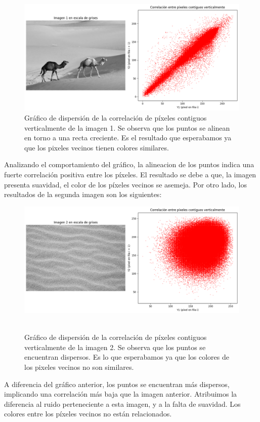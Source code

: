 \documentclass[a4paper,12pt]{article}
\begin{document}
\begin{figure}[H]
    \centering
    \includegraphics[width=1\textwidth]{Ejercicio1a.png}
        \caption{Gráfico de dispersión de la correlación de píxeles contiguos verticalmente de la imagen 1. 
    Se observa que los puntos se alinean en torno a una recta creciente. Es el resultado que esperabamos
    ya que los pixeles vecinos tienen colores similares.}
    
    \captionsetup{belowskip=0pt}
\end{figure}
\vspace{-1em}
Analizando el comportamiento del gráfico, la alineacion de los puntos indica una fuerte correlación positiva entre los píxeles.
El resultado se debe a que, la imagen presenta suavidad, el color de los píxeles vecinos se asemeja.
Por otro lado, los resultados de la segunda imagen son los siguientes:
\vspace{-1em}
\begin{figure}[H]
    \centering
    \includegraphics[width=1\textwidth]{Ejercicio1b.png}
    \ \caption{Gráfico de dispersión de la correlación de píxeles contiguos verticalmente de la imagen 2. 
    Se observa que los puntos se encuentran dispersos. Es lo que esperabamos ya que los colores de los pixeles
    vecinos no son similares.}
    \captionsetup{belowskip=0pt}
    \label{fig:correlacion2}
\end{figure}
A diferencia del gráfico anterior, los puntos se encuentran más dispersos, implicando una correlación más baja que la imagen anterior.
Atribuimos la diferencia al ruido perteneciente a esta imagen, y a la falta de suavidad. Los colores entre los píxeles vecinos no están relacionados.
\end{document}
